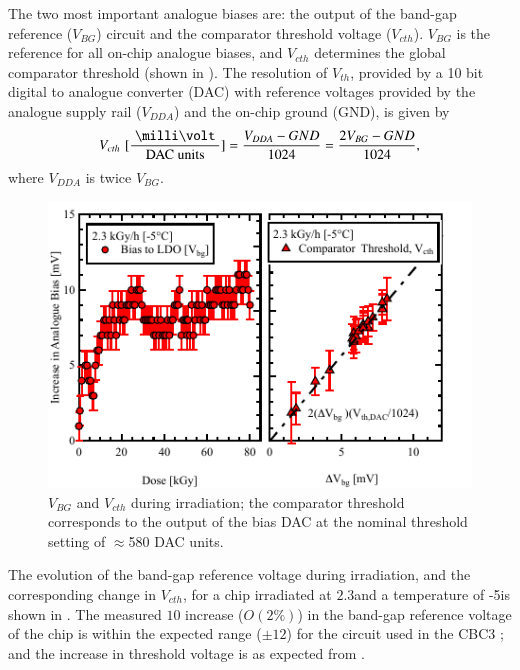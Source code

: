 The two most important analogue biases are: the output of the band-gap reference ($V_{BG}$) circuit and the comparator threshold voltage ($V_{cth}$). $V_{BG}$ is the reference for all on-chip analogue biases, and $V_{cth}$ determines the global comparator threshold (shown in ). The resolution of $V_{th}$, provided by a 10 bit digital to analogue converter (DAC) with reference voltages provided by the analogue supply rail ($V_{DDA}$) and the on-chip ground (GND), is given by
\begin{equation}
V_{cth}\,\,[\frac{\mbox{\mV}}{\mbox{DAC units}}]=\frac{V_{DDA} - GND}{1024}=\frac{2V_{BG}-GND}{1024},
\label{eq:Vcth}
\end{equation}
where $V_{DDA}$ is twice $V_{BG}$. 
\begin{figure}[htbp]
\centering
\includegraphics[width=0.9\linewidth]{Figures/Vbg_Irrad_v2.pdf}
\vspace*{-2mm}
\caption{$V_{BG}$ and $V_{cth}$ during irradiation; the comparator threshold corresponds to the output of the bias DAC at the nominal threshold setting of $\approx$580 DAC units.}
\label{fig:Vbg}
\end{figure}

The evolution of the band-gap reference voltage during irradiation, and the corresponding change in $V_{cth}$, for a chip irradiated at $2.3$\kGyH and a temperature of -5\deg is shown in . The measured $10$\mV\! increase (${O(2\%)}$) in the band-gap reference voltage of the chip is within the expected range (${\pm 12}$\mV\!) for the circuit used in the CBC3 \cite{Bandgap}; and the increase in threshold voltage is as expected from . 

